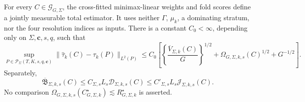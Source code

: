For every \(C\in\mathcal G_{G,\Sigma}\), the cross-fitted minimax-linear weights and fold scores define a jointly measurable total estimator. It uses neither \(\Gamma\), \(\mu_k\), a dominating stratum, nor the four resolution indices as inputs. There is a constant \(C_0<\infty\), depending only on \(\Sigma,\mathbf c,s,q\), such that \[\sup_{P\in\mathcal P_\Sigma(T,K,s,q,\mathbf c)}\|\widehat\tau_k(C)-\tau_k(P)\|_{L^2(P)}\le C_0\left[\left\{\frac{\overline V_{\Sigma,k}(C)}G\right\}^{1/2}+\Omega_{G,\Sigma,k,s}(C)^{1/2}+G^{-1/2}\right].\] Separately, \[\overline{\mathfrak B}_{\Sigma,k,s}(C)\le C_{\Sigma,s}L_s\mathcal D_{\Sigma,k,s}(C)\le C'_{\Sigma,s}L_s\mathcal J_{\Sigma,k,s}(C).\] No comparison \(\Omega_{G,\Sigma,k,s}(C_{G,\Sigma,k}^{\star})\lesssim R_{G,\Sigma,k}^{\star}\) is asserted.